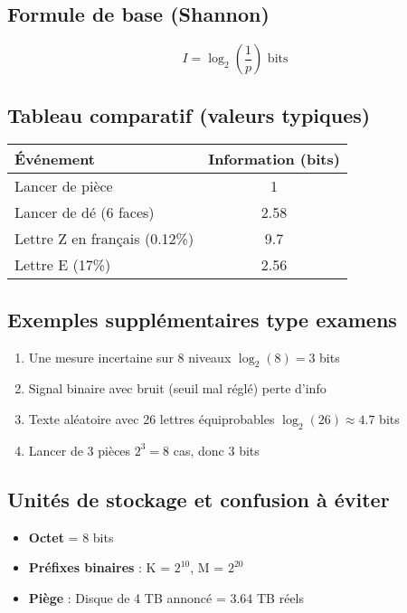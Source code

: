 \documentclass[12pt,a4paper]{article}
\begin{document}
\subsection{Formule de base (Shannon)}
\[ I = \log_2 \left( \frac{1}{p} \right) \text{ bits} \]

\subsection{Tableau comparatif (valeurs typiques)}
\begin{center}
\begin{tabular}{|l|c|}
\hline
\textbf{Événement} & \textbf{Information (bits)} \\
\hline
Lancer de pièce & 1 \\
\hline
Lancer de dé (6 faces) & 2.58 \\
\hline
Lettre Z en français (0.12\%) & 9.7 \\
\hline
Lettre E (17\%) & 2.56 \\
\hline
\end{tabular}
\end{center}

\subsection{Exemples supplémentaires type examens}
\begin{enumerate}[label=\textbf{Exemple \arabic*.}, wide, labelwidth=!, labelindent=0pt]
  \item Une mesure incertaine sur 8 niveaux \Rightarrow{} $\log_2(8) = 3$ bits
  \item Signal binaire avec bruit (seuil mal réglé) \Rightarrow{} perte d’info
  \item Texte aléatoire avec 26 lettres équiprobables \Rightarrow{} $\log_2(26) \approx 4.7$ bits
  \item Lancer de 3 pièces \Rightarrow{} $2^3 = 8$ cas, donc 3 bits
\end{enumerate}

\subsection{Unités de stockage et confusion à éviter}
\begin{itemize}
  \item \textbf{Octet} = 8 bits
  \item \textbf{Préfixes binaires} : K = $2^{10}$, M = $2^{20}$
  \item \textbf{Piège} : Disque de 4 TB annoncé = 3.64 TB réels
\end{itemize}
\end{document}
